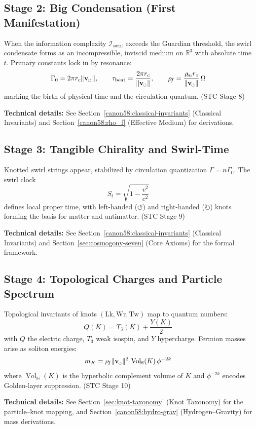 \documentclass[10pt,reprint,aps,onecolumn,nofootinbib]{revtex4-2}
\newcommand{\vnorm}{\lVert \mathbf{v}_{\mkern-2mu\scriptscriptstyle\boldsymbol{\circlearrowleft}} \rVert}               %
\newcommand{\Vol}{\operatorname{Vol}}   %
\begin{document}
\subsection*{Stage 2: Big Condensation (First Manifestation)}
When the information complexity $\mathcal{I}_{\mathrm{swirl}}$ exceeds the Guardian threshold,
the swirl condensate forms as an incompressible, inviscid medium on $\mathbb{R}^3$ with absolute time $t$.
Primary constants lock in by resonance:
\[
\Gamma_0 = 2\pi r_c \vnorm,
\qquad
\tau_{\mathrm{beat}} = \frac{2\pi r_c}{\vnorm},
\qquad
\rho_{\!f} = \frac{\rho_{\!m} r_c}{\vnorm}\,\Omega
\]
marking the birth of physical time and the circulation quantum.
\hfill (STC Stage 8)

\textbf{Technical details:} See Section~\ref{canon58:classical-invariants} (Classical Invariants) and Section~\ref{canon58:rho_f} (Effective Medium) for derivations.

\subsection*{Stage 3: Tangible Chirality and Swirl-Time}
Knotted swirl strings appear, stabilized by circulation quantization $\Gamma = n\Gamma_0$.
The swirl clock
\[
S_t = \sqrt{1 - \frac{v^{2}}{c^{2}}}
\]
defines local proper time, with left-handed ($\circlearrowleft$) and right-handed ($\circlearrowright$) knots forming the basis for matter and antimatter.
\hfill (STC Stage 9)

\textbf{Technical details:} See Section~\ref{canon58:classical-invariants} (Classical Invariants) and Section~\ref{sec:cosmogony-seven} (Core Axioms) for the formal framework.

\subsection*{Stage 4: Topological Charges and Particle Spectrum}
Topological invariants of knots $(\mathrm{Lk}, \mathrm{Wr}, \mathrm{Tw})$ map to quantum numbers:
\[
Q(K) = T_3(K) + \frac{Y(K)}{2}
\]
with $Q$ the electric charge, $T_3$ weak isospin, and $Y$ hypercharge.
Fermion masses arise as soliton energies:
\[
m_{K} = \rho_{\!f} \vnorm^{2}\, \Vol_{\!\mathbb{H}}(K)\,\phi^{-2k}
\]
where $\Vol_{\!\mathbb{H}}(K)$ is the hyperbolic complement volume of $K$
and $\phi^{-2k}$ encodes Golden-layer suppression.
\hfill (STC Stage 10)

\textbf{Technical details:} See Section~\ref{sec:knot-taxonomy} (Knot Taxonomy) for the particle–knot mapping, and Section~\ref{canon58:hydro-grav} (Hydrogen–Gravity) for mass derivations.
\end{document}
